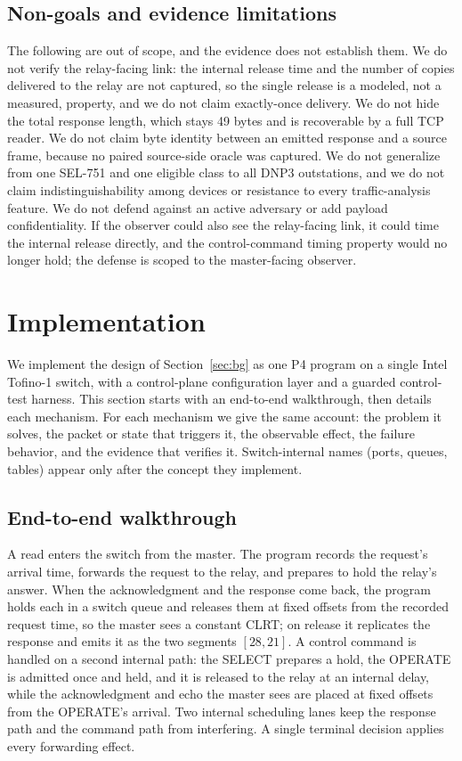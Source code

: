 \documentclass[conference]{IEEEtran}
\begin{document}
\subsection{Non-goals and evidence limitations}
The following are out of scope, and the evidence does not establish them. We do not verify the
relay-facing link: the internal release time and the number of copies delivered to the relay are not
captured, so the single release is a modeled, not a measured, property, and we do not claim
exactly-once delivery. We do not hide the total response length, which stays 49 bytes and is
recoverable by a full TCP reader. We do not claim byte identity between an emitted response and a
source frame, because no paired source-side oracle was captured. We do not generalize from one
SEL-751 and one eligible class to all DNP3 outstations, and we do not claim indistinguishability among
devices or resistance to every traffic-analysis feature. We do not defend against an active adversary
or add payload confidentiality. If the observer could also see the relay-facing link, it could time
the internal release directly, and the control-command timing property would no longer hold; the
defense is scoped to the master-facing observer.

\section{Implementation}
\label{sec:impl}

We implement the design of Section~\ref{sec:bg} as one P4 program on a single Intel Tofino-1 switch,
with a control-plane configuration layer and a guarded control-test harness. This section starts with
an end-to-end walkthrough, then details each mechanism. For each mechanism we give the same account:
the problem it solves, the packet or state that triggers it, the observable effect, the failure
behavior, and the evidence that verifies it. Switch-internal names (ports, queues, tables) appear only
after the concept they implement.

\subsection{End-to-end walkthrough}
A read enters the switch from the master. The program records the request's arrival time, forwards the
request to the relay, and prepares to hold the relay's answer. When the acknowledgment and the
response come back, the program holds each in a switch queue and releases them at fixed offsets from
the recorded request time, so the master sees a constant CLRT; on release it replicates the response
and emits it as the two segments $[28,21]$. A control command is handled on a second internal path:
the SELECT prepares a hold, the OPERATE is admitted once and held, and it is released to the relay at
an internal delay, while the acknowledgment and echo the master sees are placed at fixed offsets from
the OPERATE's arrival. Two internal scheduling lanes keep the response path and the command path from
interfering. A single terminal decision applies every forwarding effect.
\end{document}
